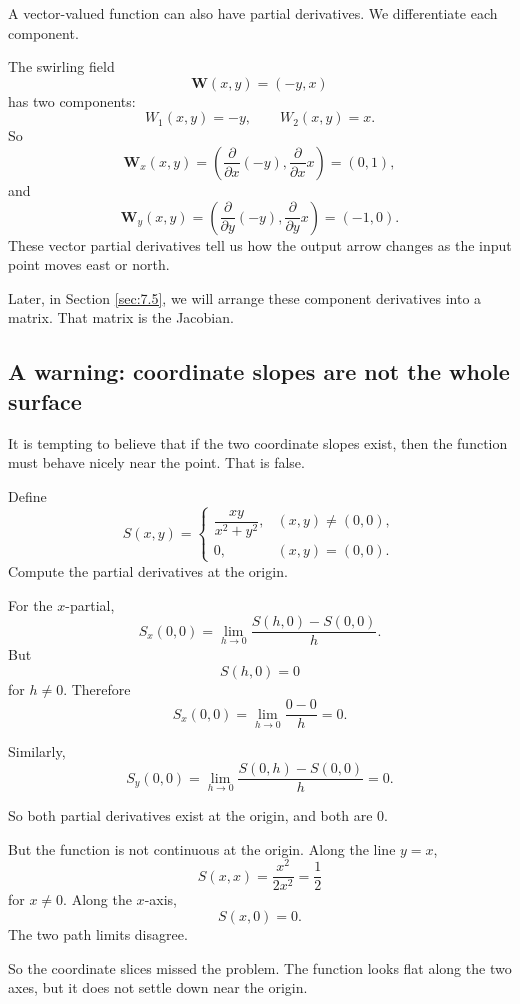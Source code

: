 A vector-valued function can also have partial derivatives.  We differentiate each
component.

\begin{example}
The swirling field
\[
    \mathbf W(x,y)=(-y,x)
\]
has two components:
\[
    W_1(x,y)=-y,
    \qquad
    W_2(x,y)=x.
\]
So
\[
    \mathbf W_x(x,y)
    =
    \left(\frac{\partial}{\partial x}(-y),\frac{\partial}{\partial x}x\right)
    =
    (0,1),
\]
and
\[
    \mathbf W_y(x,y)
    =
    \left(\frac{\partial}{\partial y}(-y),\frac{\partial}{\partial y}x\right)
    =
    (-1,0).
\]
These vector partial derivatives tell us how the output arrow changes as the input
point moves east or north.

Later, in Section \ref{sec:7.5}, we will arrange these component derivatives into a
matrix.  That matrix is the Jacobian.
\end{example}

\subsection{A warning: coordinate slopes are not the whole surface}

It is tempting to believe that if the two coordinate slopes exist, then the function must
behave nicely near the point.  That is false.

Define
\[
    S(x,y)=
    \begin{cases}
    \dfrac{xy}{x^2+y^2}, & (x,y)\ne(0,0),\\[2mm]
    0, & (x,y)=(0,0).
    \end{cases}
\]
Compute the partial derivatives at the origin.

For the \(x\)-partial,
\[
    S_x(0,0)
    =
    \lim_{h\to0}\frac{S(h,0)-S(0,0)}{h}.
\]
But
\[
    S(h,0)=0
\]
for \(h\ne0\).  Therefore
\[
    S_x(0,0)=\lim_{h\to0}\frac{0-0}{h}=0.
\]

Similarly,
\[
    S_y(0,0)
    =
    \lim_{h\to0}\frac{S(0,h)-S(0,0)}{h}
    =
    0.
\]

So both partial derivatives exist at the origin, and both are \(0\).

But the function is not continuous at the origin.  Along the line \(y=x\),
\[
    S(x,x)=\frac{x^2}{2x^2}=\frac12
\]
for \(x\ne0\).  Along the \(x\)-axis,
\[
    S(x,0)=0.
\]
The two path limits disagree.

So the coordinate slices missed the problem.  The function looks flat along the two
axes, but it does not settle down near the origin.

